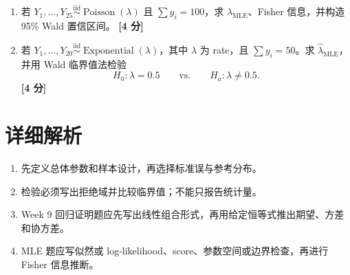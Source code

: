 \documentclass[11pt,a4paper]{article}
\newcommand{\iid}{\overset{\mathrm{iid}}{\sim}}
\newcommand{\pts}[1]{\hfill\textbf{[#1 分]}}
\begin{document}
\begin{questionbox}
\begin{enumerate}[resume]
  \item 若 $Y_1,\ldots,Y_{25}\iid\operatorname{Poisson}(\lambda)$ 且
  $\sum y_i=100$，求 $\hat\lambda_{\mathrm{MLE}}$、Fisher 信息，并构造 95\% Wald 置信区间。 \pts{4}

  \item 若 $Y_1,\ldots,Y_{20}\iid\operatorname{Exponential}(\lambda)$，其中 $\lambda$ 为 rate，且
  $\sum y_i=50$。求 $\hat\lambda_{\mathrm{MLE}}$，并用 Wald 临界值法检验
  \[
    H_0:\lambda=0.5
    \qquad\text{vs.}\qquad
    H_a:\lambda\ne0.5.
  \]
  \pts{4}
\end{enumerate}
\end{questionbox}

\newpage
\section{详细解析}

\begin{checkbox}[阅卷视角下的通用得分点]
\begin{enumerate}
  \item 先定义总体参数和样本设计，再选择标准误与参考分布。
  \item 检验必须写出拒绝域并比较临界值；不能只报告统计量。
  \item Week 9 回归证明题应先写出线性组合形式，再用给定恒等式推出期望、方差和协方差。
  \item MLE 题应写似然或 log-likelihood、score、参数空间或边界检查，再进行 Fisher 信息推断。
\end{enumerate}
\end{checkbox}
\end{document}

